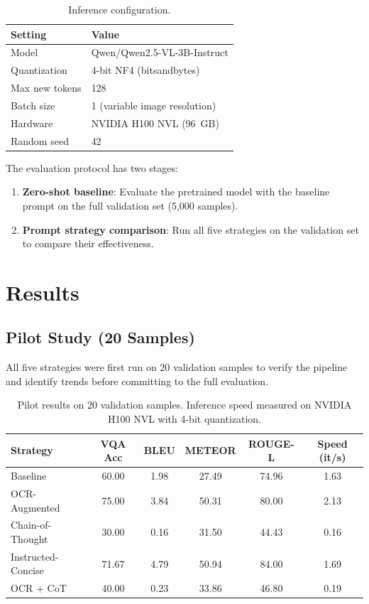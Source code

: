 \documentclass[11pt]{article}
\begin{document}
\begin{table}[H]
\centering
\caption{Inference configuration.}
\label{tab:config}
\begin{tabular}{ll}
\toprule
\textbf{Setting} & \textbf{Value} \\
\midrule
Model             & Qwen/Qwen2.5-VL-3B-Instruct \\
Quantization      & 4-bit NF4 (bitsandbytes) \\
Max new tokens    & 128 \\
Batch size        & 1 (variable image resolution) \\
Hardware          & NVIDIA H100 NVL (96~GB) \\
Random seed       & 42 \\
\bottomrule
\end{tabular}
\end{table}

The evaluation protocol has two stages:
\begin{enumerate}[nosep]
  \item \textbf{Zero-shot baseline}: Evaluate the pretrained model with the baseline prompt on the full validation set (5,000 samples).
  \item \textbf{Prompt strategy comparison}: Run all five strategies on the validation set to compare their effectiveness.
\end{enumerate}


\section{Results}

\subsection{Pilot Study (20 Samples)}

All five strategies were first run on 20 validation samples to verify the pipeline and identify trends before committing to the full evaluation.

\begin{table}[H]
\centering
\caption{Pilot results on 20 validation samples. Inference speed measured on NVIDIA H100 NVL with 4-bit quantization.}
\label{tab:pilot}
\begin{tabular}{lccccc}
\toprule
\textbf{Strategy} & \textbf{VQA Acc} & \textbf{BLEU} & \textbf{METEOR} & \textbf{ROUGE-L} & \textbf{Speed (it/s)} \\
\midrule
Baseline           & 60.00 & 1.98 & 27.49 & 74.96 & 1.63 \\
OCR-Augmented      & 75.00 & 3.84 & 50.31 & 80.00 & 2.13 \\
Chain-of-Thought   & 30.00 & 0.16 & 31.50 & 44.43 & 0.16 \\
Instructed-Concise & 71.67 & 4.79 & 50.94 & 84.00 & 1.69 \\
OCR + CoT          & 40.00 & 0.23 & 33.86 & 46.80 & 0.19 \\
\bottomrule
\end{tabular}
\end{table}
\end{document}
